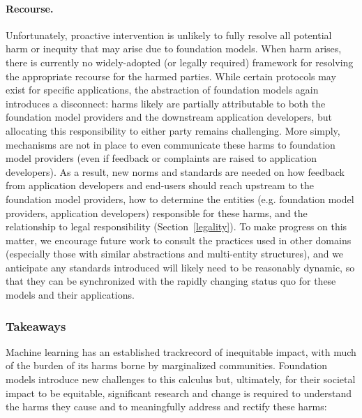 \paragraph{Recourse.}
Unfortunately, proactive intervention is unlikely to fully resolve all potential harm or inequity that may arise due to foundation models. When harm arises, there is currently no widely-adopted (or legally required) framework for resolving the appropriate recourse for the harmed parties. While certain protocols may exist for specific applications, the abstraction of foundation models again introduces a disconnect: harms likely are partially attributable to both the foundation model providers and the downstream application developers, but allocating this responsibility to either party remains challenging. More simply, mechanisms are not in place to even communicate these harms to foundation model providers (even if feedback or complaints are raised to application developers). As a result, new norms and standards are needed on  how  feedback from  application developers and end-users should reach upstream to the foundation model providers, how to determine the entities (e.g. foundation model providers, application developers) responsible for these harms, and the relationship to legal responsibility (Section~\ref{legality}).
To make progress on this matter, we encourage future work to consult the practices used in other domains (especially those with similar abstractions and multi-entity structures), and we anticipate any standards introduced will likely need to be reasonably dynamic, so that they can be synchronized with the rapidly changing status quo for these models and their applications.

\subsubsection{Takeaways}
\label{sec:fairness-takeaways}
Machine learning has an established trackrecord of inequitable impact, with much of the burden of its harms borne by marginalized communities. Foundation models introduce new challenges to this calculus but, ultimately, for their societal impact to be equitable, significant research and change is required to understand the harms they cause and to meaningfully address and rectify these harms:

